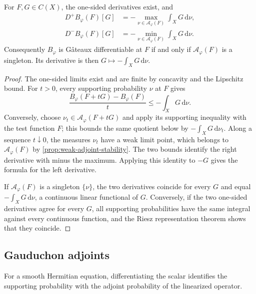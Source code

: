\begin{proposition}\label{prop:normalization-directional}
For $F,G\in C(X)$, the one-sided derivatives exist, and
\begin{align*}
 D^+B_\varphi(F)[G]&=-\max_{\nu\in\mathcal A_\varphi(F)}\int_XG\,\mathrm{d}\nu,\\
 D^-B_\varphi(F)[G]&=-\min_{\nu\in\mathcal A_\varphi(F)}\int_XG\,\mathrm{d}\nu.
\end{align*}
Consequently $B_\varphi$ is G\^ateaux differentiable at $F$ if and only if $\mathcal A_\varphi(F)$ is a singleton. Its derivative is then $G\mapsto-\int_XG\,\mathrm{d}\nu$.
\end{proposition}
\begin{proof}
The one-sided limits exist and are finite by concavity and the Lipschitz bound. For $t>0$, every supporting probability $\nu$ at $F$ gives
\[
 \frac{B_\varphi(F+tG)-B_\varphi(F)}{t}
 \leq-\int_XG\,\mathrm{d}\nu.
\]
Conversely, choose $\nu_t\in\mathcal A_\varphi(F+tG)$ and apply its supporting inequality with the test function $F$; this bounds the same quotient below by $-\int_XG\,\mathrm{d}\nu_t$. Along a sequence $t\downarrow0$, the measures $\nu_t$ have a weak limit point, which belongs to $\mathcal A_\varphi(F)$ by \cref{prop:weak-adjoint-stability}. The two bounds identify the right derivative with minus the maximum. Applying this identity to $-G$ gives the formula for the left derivative.

If $\mathcal A_\varphi(F)$ is a singleton $\{\nu\}$, the two derivatives coincide for every $G$ and equal $-\int_XG\,\mathrm{d}\nu$, a continuous linear functional of $G$. Conversely, if the two one-sided derivatives agree for every $G$, all supporting probabilities have the same integral against every continuous function, and the Riesz representation theorem shows that they coincide.
\end{proof}



\subsection{Gauduchon adjoints}

For a smooth Hermitian equation, differentiating the scalar identifies the supporting probability with the adjoint probability of the linearized operator.

